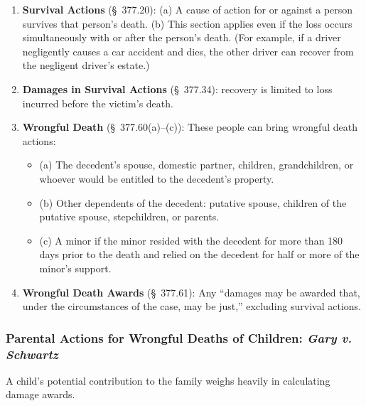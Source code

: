 \begin{enumerate}
    \item \textbf{Survival Actions} (\S\ 377.20): (a) A cause of action for or 
    against a person survives that person's death. (b) This section applies 
    even if the loss occurs simultaneously with or after the person's death.  
    (For example, if a driver negligently causes a car accident and dies, the 
    other driver can recover from the negligent driver's estate.)
    \item \textbf{Damages in Survival Actions} (\S\ 377.34): recovery is 
    limited to loss incurred before the victim's death.
    \item \textbf{Wrongful Death} (\S\ 377.60(a)--(c)): These people can bring 
    wrongful death actions:
    \begin{itemize}
        \item (a) The decedent's spouse, domestic partner, children, 
        grandchildren, or whoever would be entitled to the decedent's 
        property.
        \item (b) Other dependents of the decedent: putative spouse, children 
        of the putative spouse, stepchildren, or parents.
        \item (c) A minor if the minor resided with the decedent for more than 
        180 days prior to the death and relied on the decedent for half or 
        more of the minor's support.
    \end{itemize}
    \item \textbf{Wrongful Death Awards} (\S\ 377.61): Any ``damages may be 
    awarded that, under the circumstances of the case, may be just,'' 
    excluding survival actions.
\end{enumerate}

\subsubsection{Parental Actions for Wrongful Deaths of Children: \emph{Gary v.  
Schwartz}}

A child's potential contribution to the family weighs heavily in calculating 
damage awards.

